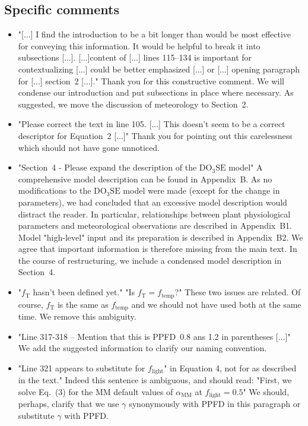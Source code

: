 \documentclass{scrartcl}
\begin{document}
\subsection*{Specific comments}
\begin{itemize}
    
    \item {\color{blue} "[...] I find the introduction to be a bit longer than would be most effective for conveying this information. It would be helpful to break it into subsections [...]. [...]content of [...] lines 115--134 is important for contextualizing [...] could be better emphasized [...] or [...] opening paragraph for [...] section~2 [...]."} Thank you for this constructive comment. We will condense our introduction and put subsections in place where necessary. As suggested, we move the discussion of meteorology to Section~2.
    \item {\color{blue} "Please correct the text in line 105. [...] This doesn't seem to be a correct descriptor for Equation~2 [...]"} Thank you for pointing out this carelessness which should not have gone unnoticed.
    \item {\color{blue} "Section~4 - Please expand the description of the $\mathrm{DO_3SE}$ model"} A comprehensive model description can be found in Appendix~B. As no modifications to the $\mathrm{DO_3SE}$ model were made (except for the change in parameters), we had concluded that an excessive model description would distract the reader. In particular, relationships between plant physiological parameters and meteorological observations are described in Appendix~B1. Model "high-level" input and its preparation is described in Appendix~B2. We agree that important information is therefore missing from the main text. In the course of restructuring, we include a condensed model description in Section~4.
    \item {\color{blue} "$f_\mathrm{T}$ hasn't been defined yet." "Is $f_\mathrm{T} = f_\mathrm{temp}$?"} These two issues are related. Of course, $f_\mathrm{T}$ is the same as $f_\mathrm{temp}$ and we should not have used both at the same time. We remove this ambiguity.
    \item {\color{blue} "Line 317-318 -- Mention that this is PPFD~0.8 ans 1.2 in parentheses [...]"} We add the suggested information to clarify our naming convention.
    \item {\color{blue} "Line 321 appears to substitute for $f_\mathrm{light}$" in Equation 4, not for as described in the text."} Indeed this sentence is ambiguous, and should read: "First, we solve Eq.~(3) for the MM default values of $\alpha_\mathrm{MM}$ at $f_\mathrm{light}=0.5$" We should, perhaps, clarify that we use $\gamma$ synonymously with PPFD in this paragraph or substitute $\gamma$ with PPFD.

\end{itemize}
\end{document}
